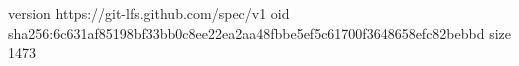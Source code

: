 version https://git-lfs.github.com/spec/v1
oid sha256:6c631af85198bf33bb0c8ee22ea2aa48fbbe5ef5c61700f3648658efc82bebbd
size 1473
